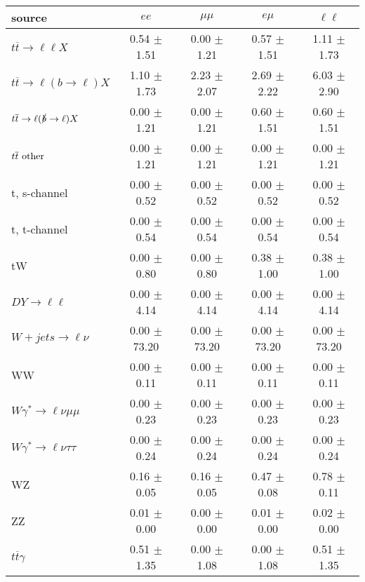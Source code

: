 \begin{tabular}{l|cccc} \hline\hline
source & $ee$ & $\mu\mu$ & $e\mu$ & $\ell\ell $ \\
\hline
$t\overline{t} \rightarrow \ell \ell X$ &  0.54 $\pm$  1.51 &  0.00 $\pm$  1.21 &  0.57 $\pm$  1.51 &  1.11 $\pm$  1.73 \\
$t\overline{t} \rightarrow \ell (b \rightarrow \ell) X$ &  1.10 $\pm$  1.73 &  2.23 $\pm$  2.07 &  2.69 $\pm$  2.22 &  6.03 $\pm$  2.90 \\
$t\overline{t} \rightarrow \ell (\slashed b \rightarrow \ell) X$ &  0.00 $\pm$  1.21 &  0.00 $\pm$  1.21 &  0.60 $\pm$  1.51 &  0.60 $\pm$  1.51 \\
        $t\overline{t}\ \rm{other}$ &  0.00 $\pm$  1.21 &  0.00 $\pm$  1.21 &  0.00 $\pm$  1.21 &  0.00 $\pm$  1.21 \\
\hline
                       t, s-channel &  0.00 $\pm$  0.52 &  0.00 $\pm$  0.52 &  0.00 $\pm$  0.52 &  0.00 $\pm$  0.52 \\
                       t, t-channel &  0.00 $\pm$  0.54 &  0.00 $\pm$  0.54 &  0.00 $\pm$  0.54 &  0.00 $\pm$  0.54 \\
                                 tW &  0.00 $\pm$  0.80 &  0.00 $\pm$  0.80 &  0.38 $\pm$  1.00 &  0.38 $\pm$  1.00 \\
\hline
         $DY \rightarrow \ell \ell$ &  0.00 $\pm$  4.14 &  0.00 $\pm$  4.14 &  0.00 $\pm$  4.14 &  0.00 $\pm$  4.14 \\
      $W+jets \rightarrow \ell \nu$ &  0.00 $\pm$ 73.20 &  0.00 $\pm$ 73.20 &  0.00 $\pm$ 73.20 &  0.00 $\pm$ 73.20 \\
                                 WW &  0.00 $\pm$  0.11 &  0.00 $\pm$  0.11 &  0.00 $\pm$  0.11 &  0.00 $\pm$  0.11 \\
\hline
$W\gamma^{*} \rightarrow \ell \nu \mu\mu$ &  0.00 $\pm$  0.23 &  0.00 $\pm$  0.23 &  0.00 $\pm$  0.23 &  0.00 $\pm$  0.23 \\
$W\gamma^{*} \rightarrow \ell \nu \tau\tau$ &  0.00 $\pm$  0.24 &  0.00 $\pm$  0.24 &  0.00 $\pm$  0.24 &  0.00 $\pm$  0.24 \\
                                 WZ &  0.16 $\pm$  0.05 &  0.16 $\pm$  0.05 &  0.47 $\pm$  0.08 &  0.78 $\pm$  0.11 \\
                                 ZZ &  0.01 $\pm$  0.00 &  0.00 $\pm$  0.00 &  0.01 $\pm$  0.00 &  0.02 $\pm$  0.00 \\
\hline
              $t\overline{t}\gamma$ &  0.51 $\pm$  1.35 &  0.00 $\pm$  1.08 &  0.00 $\pm$  1.08 &  0.51 $\pm$  1.35 \\

\end{tabular}
